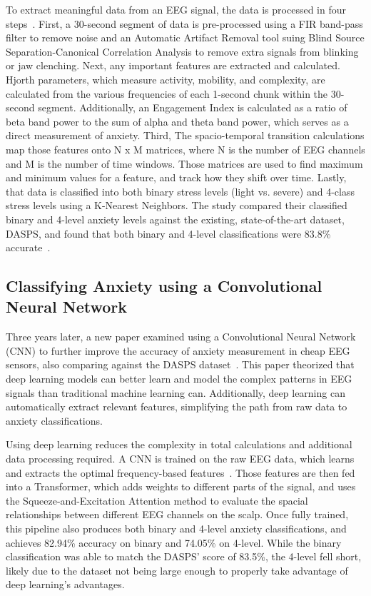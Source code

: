 \documentclass[journal]{IEEEtran}
\begin{document}
To extract meaningful data from an EEG signal, the data is processed in four steps~\cite[pg.~4]{ChatterjeeDebatri2023Doms}. First, a 30-second segment of data is pre-processed using a FIR band-pass filter to remove noise and an Automatic Artifact Removal tool suing Blind Source Separation-Canonical Correlation Analysis to remove extra signals from blinking or jaw clenching. Next, any important features are extracted and calculated. Hjorth parameters, which measure activity, mobility, and complexity, are calculated from the various frequencies of each 1-second chunk within the 30-second segment. Additionally, an Engagement Index is calculated as a ratio of beta band power to the sum of alpha and theta band power, which serves as a direct measurement of anxiety. Third, The spacio-temporal transition calculations map those features onto N x M matrices, where N is the number of EEG channels and M is the number of time windows. Those matrices are used to find maximum and minimum values for a feature, and track how they shift over time. Lastly, that data is classified into both binary stress levels (light vs. severe) and 4-class stress levels using a K-Nearest Neighbors. The study compared their classified binary and 4-level anxiety levels against the existing, state-of-the-art dataset, DASPS, and found that both binary and 4-level classifications were 83.8\% accurate~\cite[pg.~5]{ChatterjeeDebatri2023Doms}.

\subsection{Classifying Anxiety using a Convolutional Neural Network}
Three years later, a new paper examined using a Convolutional Neural Network (CNN) to further improve the accuracy of anxiety measurement in cheap EEG sensors, also comparing against the DASPS dataset~\cite{GhonchiHamidreza2025MMCA}. This paper theorized that deep learning models can better learn and model the complex patterns in EEG signals than traditional machine learning can. Additionally, deep learning can automatically extract relevant features, simplifying the path from raw data to anxiety classifications.

Using deep learning reduces the complexity in total calculations and additional data processing required. A CNN is trained on the raw EEG data, which learns and extracts the optimal frequency-based features~\cite{GhonchiHamidreza2025MMCA}. Those features are then fed into a Transformer, which adds weights to different parts of the signal, and uses the Squeeze-and-Excitation Attention method to evaluate the spacial relationships between different EEG channels on the scalp. Once fully trained, this pipeline also produces both binary and 4-level anxiety classifications, and achieves 82.94\% accuracy on binary and 74.05\% on 4-level. While the binary classification was able to match the DASPS' score of 83.5\%, the 4-level fell short, likely due to the dataset not being large enough to properly take advantage of deep learning's advantages.
\end{document}
